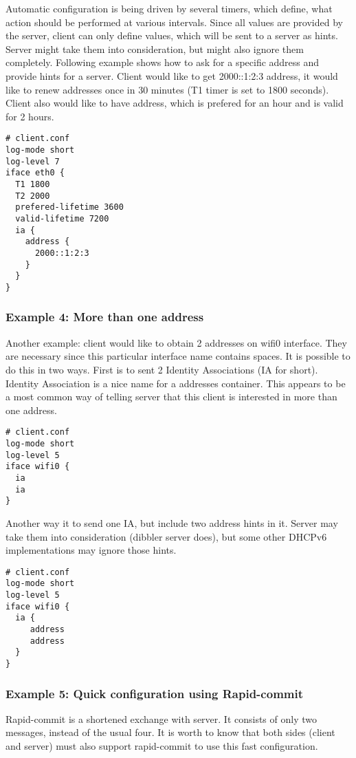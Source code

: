 Automatic configuration is being driven by several timers, which define,
what action should be performed at various intervals. Since all
values are provided by the server, client can only define values, which
will be sent to a server as hints. Server might take them into
consideration, but might also ignore them
completely. Following example shows how to ask for a specific address
and provide hints for a server. Client would like to get 2000::1:2:3
address, it would like to renew addresses once in 30 minutes (T1 timer
is set to 1800 seconds). Client also would like to have address, which
is prefered for an hour and is valid for 2 hours.

\begin{lstlisting}
# client.conf
log-mode short
log-level 7
iface eth0 {
  T1 1800
  T2 2000
  prefered-lifetime 3600
  valid-lifetime 7200
  ia {
    address {
      2000::1:2:3
    }
  }
}
\end{lstlisting}

\subsubsection{Example 4: More than one address}

Another example: client would like to obtain 2 addresses on
wifi0 interface. They are necessary since this particular interface name
contains spaces. It is possible to do this in two ways. First is to
sent 2 Identity Associations (IA for short). Identity Association is a
nice name for a addresses container. This appears to be a most common
way of telling server that this client is interested in more than one
address.

\begin{lstlisting}
# client.conf
log-mode short
log-level 5
iface wifi0 {
  ia
  ia
}
\end{lstlisting}

Another way it to send one IA, but include two address hints in
it. Server may take them into consideration (dibbler server does), but
some other DHCPv6 implementations may ignore those hints.

\begin{lstlisting}
# client.conf
log-mode short
log-level 5
iface wifi0 {
  ia {
     address
     address
  }
}
\end{lstlisting}

\subsubsection{Example 5: Quick configuration using Rapid-commit}
Rapid-commit is a shortened exchange with server. It consists of only
two messages, instead of the usual four. It is worth to know that both sides (client
and server) must also support rapid-commit to use this fast
configuration.

